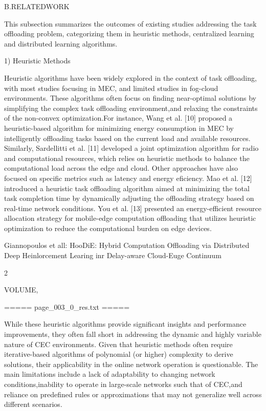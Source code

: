 \documentclass{article}
\begin{document}
B.RELATEDWORK

This subsection summarizes the outcomes of existing studies addressing the task offloading problem, categorizing them in heuristic methods, centralized learning and distributed learning algorithms.

1) Heuristic Methods

Heuristic algorithms have been widely explored in the context of task offloading, with most studies focusing in MEC, and limited studies in fog-cloud environments. These algorithms often focus on finding near-optimal solutions by simplifying the complex task offloading environment,and relaxing the constraints of the non-convex optimization.For instance, Wang et al. [10] proposed a heuristic-based algorithm for minimizing energy consumption in MEC by intelligently offloading tasks based on the current load and available resources. Similarly, Sardellitti et al. [11] developed a joint optimization algorithm for radio and computational resources, which relies on heuristic methods to balance the computational load across the edge and cloud. Other approaches have also focused on specific metrics such as latency and energy eficiency. Mao et al. [12] introduced a heuristic task offloading algorithm aimed at minimizing the total task completion time by dynamically adjusting the offloading strategy based on real-time network conditions. You et al. [13] presented an energy-efficient resource allocation strategy for mobile-edge computation offloading that utilizes heuristic optimization to reduce the computational burden on edge devices.

Giannopoulos et all: HooDiE: Hybrid Computation Offloading via Distributed Deep Heinlorcement Learing inr Delay-aware Cloud-Euge Continuum

2

VOLUME,

===== page\_003\_0\_res.txt =====


While these heuristic algorithms provide significant insights and performance improvements, they often fall short in addressing the dynamic and highly variable nature of CEC environments. Given that heuristic methods often require iterative-based algorithms of polynomial (or higher) complexity to derive solutions, their applicability in the online network operation is questionable. The main limitations include a lack of adaptability to changing network conditions,inability to operate in large-scale networks such that of CEC,and reliance on predefined rules or approximations that may not generalize well across different scenarios.
\end{document}
